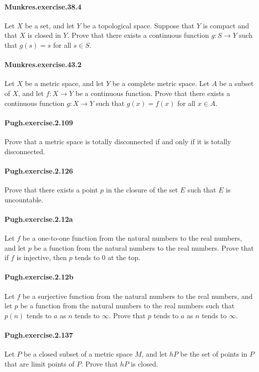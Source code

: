 \documentclass{article}
\begin{document}
\paragraph{Munkres.exercise.38.4} Let $X$ be a set, and let $Y$ be a topological space. Suppose that $Y$ is compact and that $X$ is closed in $Y$. Prove that there exists a continuous function $g: S \to Y$ such that $g(s) = s$ for all $s \in S$.

\paragraph{Munkres.exercise.43.2} Let $X$ be a metric space, and let $Y$ be a complete metric space. Let $A$ be a subset of $X$, and let $f: X \to Y$ be a continuous function. Prove that there exists a continuous function $g: X \to Y$ such that $g(x)=f(x)$ for all $x \in A$.

\paragraph{Pugh.exercise.2.109} Prove that a metric space is totally disconnected if and only if it is totally disconnected.

\paragraph{Pugh.exercise.2.126} Prove that there exists a point $p$ in the closure of the set $E$ such that $E$ is uncountable.

\paragraph{Pugh.exercise.2.12a} Let $f$ be a one-to-one function from the natural numbers to the real numbers, and let $p$ be a function from the natural numbers to the real numbers. Prove that if $f$ is injective, then $p$ tends to $0$ at the top.

\paragraph{Pugh.exercise.2.12b} Let $f$ be a surjective function from the natural numbers to the real numbers, and let $p$ be a function from the natural numbers to the real numbers such that $p(n)$ tends to $a$ as $n$ tends to $\infty$. Prove that $p$ tends to $a$ as $n$ tends to $\infty$.

\paragraph{Pugh.exercise.2.137} Let $P$ be a closed subset of a metric space $M$, and let $hP$ be the set of points in $P$ that are limit points of $P$. Prove that $hP$ is closed.
\end{document}

